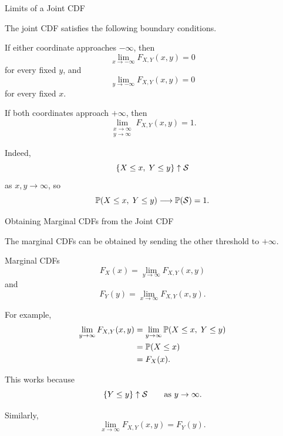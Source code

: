 \begin{frame}{Limits of a Joint CDF}

The joint CDF satisfies the following boundary conditions.

If either coordinate approaches \(-\infty\), then
\[
\boxed{
\lim_{x\to-\infty}F_{X,Y}(x,y)=0
}
\]
for every fixed \(y\), and
\[
\boxed{
\lim_{y\to-\infty}F_{X,Y}(x,y)=0
}
\]
for every fixed \(x\).

If both coordinates approach \(+\infty\), then
\[
\boxed{
\lim_{\substack{x\to\infty\\y\to\infty}}
F_{X,Y}(x,y)
=
1.
}
\]

Indeed,
\[
\{X\le x,\;Y\le y\}
\uparrow
\mathcal{S}
\]
as \(x,y\to\infty\), so
\[
\mathbb{P}(X\le x,\;Y\le y)\longrightarrow\mathbb{P}(\mathcal{S})=1.
\]

\end{frame}


\begin{frame}{Obtaining Marginal CDFs from the Joint CDF}

The marginal CDFs can be obtained by sending the other threshold to
\(+\infty\).

\begin{keybox}{Marginal CDFs}
\[
\boxed{
F_X(x)
=
\lim_{y\to\infty}F_{X,Y}(x,y)
}
\]
and
\[
\boxed{
F_Y(y)
=
\lim_{x\to\infty}F_{X,Y}(x,y).
}
\]
\end{keybox}

For example,
\[
\begin{aligned}
\lim_{y\to\infty}F_{X,Y}(x,y)
&=
\lim_{y\to\infty}
\mathbb{P}(X\le x,\;Y\le y)
\\
&=
\mathbb{P}(X\le x)
\\
&=
F_X(x).
\end{aligned}
\]

This works because
\[
\{Y\le y\}\uparrow\mathcal{S}
\qquad\text{as }y\to\infty.
\]

Similarly,
\[
\lim_{x\to\infty}F_{X,Y}(x,y)=F_Y(y).
\]

\end{frame}




